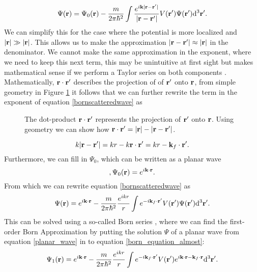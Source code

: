 \begin{equation}
	\label{bornscatteredwave}
	\Psi(\vb{r}) = \Psi_0(\vb{r}) - \frac{m}{2 \pi \hbar^2} \int \frac{e^{i\vb{k}| \vb{r} -  \vb{r}'|}}{\qty| \vb{r} -  \vb{r}'|}V(\vb{r}')\Psi(\vb{r}')\dd^3 \vb{r}'.
\end{equation}
We can simplify this for the case where the potential is more localized and $\abs{\vb{r}} \gg \abs{\vb{r}}$. This allows us to make the approximation $\abs{\vb{r} - \vb{r'}} \approx \abs{\vb{r}}$ in the denominator. We cannot make the same approximation in the exponent, where we need to keep this next term, this may be unintuitive at first sight but makes mathematical sense if we perform a Taylor series on both components \cite{Griffiths_QM}. Mathematically, $\vb{r} \cdot \vb{r'}$ describes the projection of of $\vb{r'}$ onto $\vb{r}$, from simple geometry in Figure \ref{vector_math} it follows that we can further rewrite the term in the exponent of equation \ref{bornscatteredwave} as
\begin{figure}
	\centering
	\def\svgwidth{\textwidth}
	
	\caption{The dot-product $\vb{r} \cdot \vb{r}'$ represents the projection of $\vb{r}'$ onto $\vb{r}$. Using geometry we can show how $\vb{r} \cdot \vb{r}' = \abs{\vb{r}} - \abs{\vb{r} - \vb{r}'}$.}
	\label{vector_math}
\end{figure}
\begin{equation}
	k \abs{\vb{r} - \vb{r}'} = kr - k \vb{r}\cdot\vb{r}' = kr - \vb{k}_f \cdot \vb{r}'.
\end{equation}
Furthermore, we can fill in $\Psi_0$, which can be written as a planar wave \cite{born_detailed}
\begin{equation}\label{planar_wave},
	\Psi_0(\vb{r})  = e^{i\vb{k}\cdot \vb{r}}.
\end{equation}
From which we can rewrite equation \ref{bornscatteredwave} as
\begin{equation}\label{born_equation_almost}
	\Psi(\vb{r}) = e^{i\vb{k}\cdot \vb{r}} -  \frac{m}{2 \pi \hbar^2} \frac{e^{ikr}}{r} \int e^{-i\vb{k}_f\cdot \vb{r'}}V(\vb{r}')\Psi(\vb{r}')\dd^3 \vb{r}'.
\end{equation}
This can be solved using a so-called Born series \cite{born_detailed}, where we can find the first-order Born Approximation by putting the solution $\Psi$ of a planar wave from equation \ref{planar_wave} in to equation \ref{born_equation_almost}:
\begin{equation}\label{born_equation_first_order}
	\Psi_1(\vb{r}) = e^{i\vb{k}\cdot \vb{r}} -  \frac{m}{2 \pi \hbar^2} \frac{e^{ikr}}{r} \int e^{-i\vb{k}_f\cdot \vb{r'}}V(\vb{r}')e^{i\vb{k}\cdot\vb{r}-\vb{k}_f\cdot \vb{r}}\dd^3 \vb{r}'.
\end{equation}
